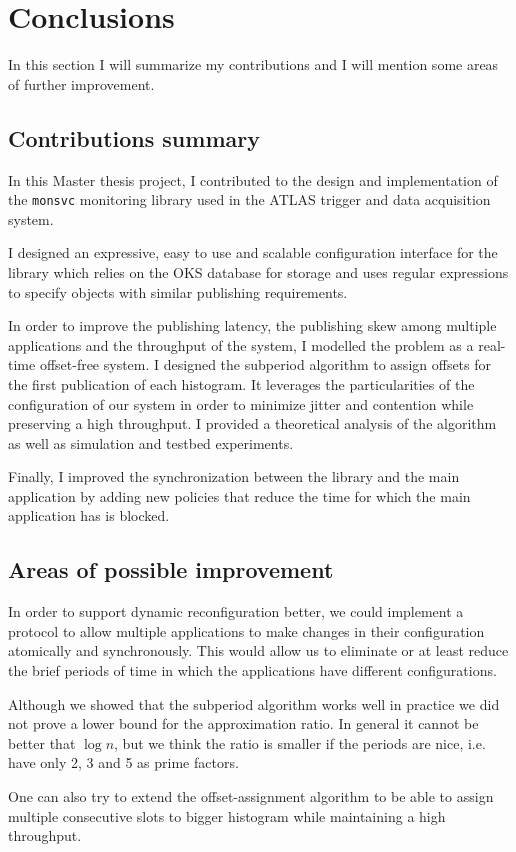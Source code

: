 \chapter{Conclusions} %
\label{Capitolul6}


In this section I will summarize my contributions and I will mention some areas of further improvement.

\section{Contributions summary}

In this Master thesis project, I contributed to the design and implementation of the {\tt monsvc} monitoring library used in the ATLAS trigger and data acquisition system.

I designed an expressive, easy to use and scalable configuration interface for the library which relies on the OKS \citep{jones1998oks} database for storage and uses regular expressions to specify objects with similar publishing requirements.

In order to improve the publishing latency, the publishing skew among multiple applications and the throughput of the system, I modelled the problem as a real-time offset-free system. I designed the subperiod algorithm to assign offsets for the first publication of each histogram. It leverages the particularities of the configuration of our system in order to minimize jitter and contention while preserving a high throughput. I provided a theoretical analysis of the algorithm as well as simulation and testbed experiments.

Finally, I improved the synchronization between the library and the main application by adding new policies that reduce the time for which the main application has is blocked.


\section{Areas of possible improvement}

In order to support dynamic reconfiguration better, we could implement a protocol to allow multiple applications to make changes in their configuration atomically and synchronously. This would allow us to eliminate or at least reduce the brief periods of time in which the applications have different configurations.

Although we showed that the subperiod algorithm works well in practice we did not prove a lower bound for the approximation ratio. In general it cannot be better that $\log n$, but we think the ratio is smaller if the periods are nice, i.e. have only 2, 3 and 5 as prime factors.

One can also try to extend the offset-assignment algorithm to be able to assign multiple consecutive slots to bigger histogram while maintaining a high throughput. 
